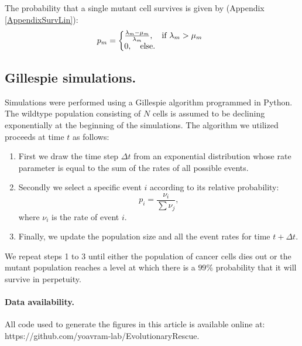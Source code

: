 \documentclass[12pt]{extarticle}
\begin{document}
The probability that a single mutant cell survives is given by (Appendix \ref{AppendixSurvLin}):
\begin{equation}
p_m = \left\{
  \begin{array}{@{}ll@{}}
  \frac{\lambda_m-\mu_m}{\lambda_m},\quad\text{if }\lambda_m>\mu_m \\
   0,\quad\text{else}.
  \end{array}\right.
\end{equation}

\subsection*{Gillespie simulations.} 
Simulations were performed using a Gillespie algorithm\cite{gillespie1976general,gillespie1977exact} programmed in Python. The wildtype population consisting of $N$ cells is assumed to be declining exponentially at the beginning of the simulations. The algorithm we utilized proceeds at time $t$ as follows:
\begin{enumerate}
\item First we draw the time step $\Delta t$ from an exponential distribution whose rate parameter is equal to the sum of the rates of all possible events.
\item Secondly we select a specific event $i$ according to its relative probability:
\begin{equation*}
p_i=\frac{\nu_i}{\sum \nu_j},
\end{equation*}
where $\nu_i$ is the rate of event $i$.
\item Finally, we update the population size and all the event rates for time $t+\Delta t$.
\end{enumerate}
We repeat steps 1 to 3 until either the population of cancer cells dies out or the mutant population reaches a level at which there is a $99\%$ probability that 
it will survive in perpetuity.
\paragraph{Data availability.} All code used to generate the figures in this article is available online at: {\color{blue}https://github.com/yoavram-lab/EvolutionaryRescue}. 


\end{document}
